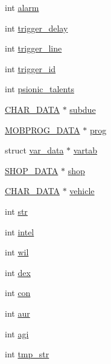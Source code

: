 \begin{DoxyCompactItemize}
\item 
int \hyperlink{structchar__data_ad59560c4a39d07aeb1ed8e5e4f227399}{alarm}
\item 
int \hyperlink{structchar__data_a6d5916be0fc98a1ce9bb73d86998bed7}{trigger\-\_\-delay}
\item 
int \hyperlink{structchar__data_ab2918aea820154a94629ebc31f3cbce1}{trigger\-\_\-line}
\item 
int \hyperlink{structchar__data_ae9c1e8555bd11000da7abe6e49814e5b}{trigger\-\_\-id}
\item 
int \hyperlink{structchar__data_a1436cad15234a4d6685504c1d31d028a}{psionic\-\_\-talents}
\item 
\hyperlink{structs_8h_af33ed1e66e8541a08bed257124f50f31}{C\-H\-A\-R\-\_\-\-D\-A\-T\-A} $\ast$ \hyperlink{structchar__data_a3d9e680037c98e4f0060010a9be6eedc}{subdue}
\item 
\hyperlink{structs_8h_aff97465f085904952dbb89cbc3aaf55d}{M\-O\-B\-P\-R\-O\-G\-\_\-\-D\-A\-T\-A} $\ast$ \hyperlink{structchar__data_ab4fafe21d85f0fd4b2ded4637c926887}{prog}
\item 
struct \hyperlink{structvar__data}{var\-\_\-data} $\ast$ \hyperlink{structchar__data_a21b26d3ed662ab38f1a50821d22308eb}{vartab}
\item 
\hyperlink{structs_8h_a64daf8ee5ea5575868b3ea5a37b4f437}{S\-H\-O\-P\-\_\-\-D\-A\-T\-A} $\ast$ \hyperlink{structchar__data_a2334d2351e00dfc19c166622a81c664e}{shop}
\item 
\hyperlink{structs_8h_af33ed1e66e8541a08bed257124f50f31}{C\-H\-A\-R\-\_\-\-D\-A\-T\-A} $\ast$ \hyperlink{structchar__data_a3880725474acf8e426b86a341d1837a9}{vehicle}
\item 
int \hyperlink{structchar__data_aa01f4dddc3aa568c72eb2da430d26fcd}{str}
\item 
int \hyperlink{structchar__data_ad6da2a59ca82a509d1c8f0d0c9ef536e}{intel}
\item 
int \hyperlink{structchar__data_ad124ef3438b14c75c2e47a4a329643fd}{wil}
\item 
int \hyperlink{structchar__data_a470183c4d71bfe130280be0f1643e90d}{dex}
\item 
int \hyperlink{structchar__data_a95c70e068dbdba42c67e884dd955adf1}{con}
\item 
int \hyperlink{structchar__data_a4799dbd41fa9f517a73e1ca16f1568b2}{aur}
\item 
int \hyperlink{structchar__data_a81ce16fafb43c9c3da25f08bafa45354}{agi}
\item 
int \hyperlink{structchar__data_a9a794fd66bc0d908a2850f6b9dc1b819}{tmp\-\_\-str}

\end{DoxyCompactItemize}
